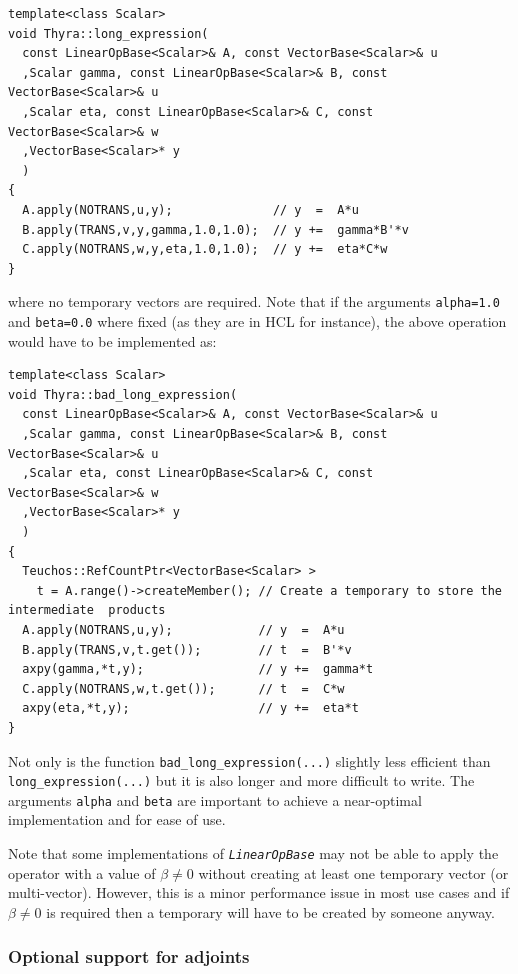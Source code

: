 \documentclass[pdf,ps2pdf,11pt]{SANDreport}
\begin{document}
{\scriptsize\begin{verbatim}
template<class Scalar>
void Thyra::long_expression(
  const LinearOpBase<Scalar>& A, const VectorBase<Scalar>& u
  ,Scalar gamma, const LinearOpBase<Scalar>& B, const VectorBase<Scalar>& u
  ,Scalar eta, const LinearOpBase<Scalar>& C, const VectorBase<Scalar>& w
  ,VectorBase<Scalar>* y
  )
{
  A.apply(NOTRANS,u,y);              // y  =  A*u
  B.apply(TRANS,v,y,gamma,1.0,1.0);  // y +=  gamma*B'*v
  C.apply(NOTRANS,w,y,eta,1.0,1.0);  // y +=  eta*C*w
}
\end{verbatim}}

{}\noindent{}where no temporary vectors are required.  Note that if
the arguments {}\texttt{alpha=1.0} and {}\texttt{beta=0.0} where fixed
(as they are in HCL for instance), the above operation would have to
be implemented as:

{\scriptsize\begin{verbatim}
template<class Scalar>
void Thyra::bad_long_expression(
  const LinearOpBase<Scalar>& A, const VectorBase<Scalar>& u
  ,Scalar gamma, const LinearOpBase<Scalar>& B, const VectorBase<Scalar>& u
  ,Scalar eta, const LinearOpBase<Scalar>& C, const VectorBase<Scalar>& w
  ,VectorBase<Scalar>* y
  )
{
  Teuchos::RefCountPtr<VectorBase<Scalar> >
    t = A.range()->createMember(); // Create a temporary to store the intermediate  products
  A.apply(NOTRANS,u,y);            // y  =  A*u
  B.apply(TRANS,v,t.get());        // t  =  B'*v
  axpy(gamma,*t,y);                // y +=  gamma*t
  C.apply(NOTRANS,w,t.get());      // t  =  C*w
  axpy(eta,*t,y);                  // y +=  eta*t
}
\end{verbatim}}

Not only is the function {}\texttt{bad\-\_long\-\_expression(\-...)}
slightly less efficient than {}\texttt{long\-\_expression(\-...)} but
it is also longer and more difficult to write.  The arguments
{}\texttt{alpha} and {}\texttt{beta} are important to achieve a
near-optimal implementation and for ease of use.

Note that some implementations of {}\texttt{\textit{Linear\-Op\-Base}} may not
be able to apply the operator with a value of $\beta {}\ne 0$ without
creating at least one temporary vector (or multi-vector).  However,
this is a minor performance issue in most use cases and if $\beta
{}\ne 0$ is required then a temporary will have to be created by
someone anyway.

%
\subsubsection{Optional support for adjoints}
\label{tsfcore:sec:linear_op_adjoints}
%
\end{document}
